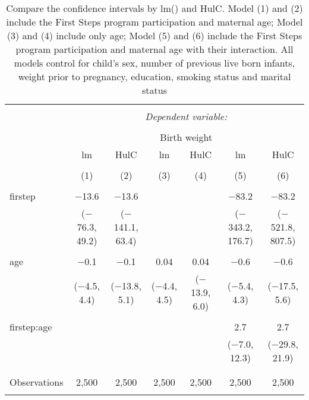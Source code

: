 
\begin{table}[!htbp] \centering 
  \caption{Compare the confidence intervals by lm() and HulC. Model (1) and (2) include the First Steps program participation and maternal age; Model (3) and (4) include only age; Model (5) and (6) include the First Steps program participation and maternal age with their interaction. All models control for child’s sex, number of previous live born infants, weight prior to pregnancy, education, smoking status and marital status} 
  \label{tbl:lm-ci} 
\begin{tabular}{@{\extracolsep{-10pt}}lcccccc} 
\\[-1.8ex]\hline 
\hline \\[-1.8ex] 
 & \multicolumn{6}{c}{\textit{Dependent variable:}} \\ 
\cline{2-7} 
\\[-1.8ex] & \multicolumn{6}{c}{Birth weight} \\ 
 & lm & HulC & lm & HulC & lm & HulC \\ 
\\[-1.8ex] & (1) & (2) & (3) & (4) & (5) & (6)\\ 
\hline \\[-1.8ex] 
 firstep & $-$13.6 & $-$13.6 &  &  & $-$83.2 & $-$83.2 \\ 
  & ($-$76.3, 49.2) & ($-$141.1, 63.4) &  &  & ($-$343.2, 176.7) & ($-$521.8, 807.5) \\ 
  & & & & & & \\ 
 age & $-$0.1 & $-$0.1 & 0.04 & 0.04 & $-$0.6 & $-$0.6 \\ 
  & ($-$4.5, 4.4) & ($-$13.8, 5.1) & ($-$4.4, 4.5) & ($-$13.9, 6.0) & ($-$5.4, 4.3) & ($-$17.5, 5.6) \\ 
  & & & & & & \\ 
 firstep:age &  &  &  &  & 2.7 & 2.7 \\ 
  &  &  &  &  & ($-$7.0, 12.3) & ($-$29.8, 21.9) \\ 
  & & & & & & \\ 
\hline \\[-1.8ex] 
Observations & 2,500 & 2,500 & 2,500 & 2,500 & 2,500 & 2,500 \\ 
\hline 
\hline \\[-1.8ex] 
\end{tabular} 
\end{table} 
